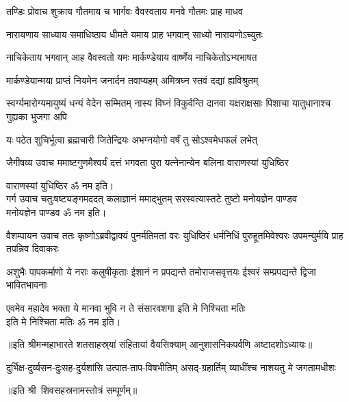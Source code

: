 \twolineshloka
{तण्डिः प्रोवाच शुक्राय गौतमाय च भार्गवः}%
{वैवस्वताय मनवे गौतमः प्राह माधव}%

\twolineshloka
{नारायणाय साध्याय समाधिष्ठाय धीमते}%
{यमाय प्राह भगवान् साध्यो नारायणोऽच्युतः}%

\twolineshloka
{नाचिकेताय भगवान् आह वैवस्वतो यमः}%
{मार्कण्डेयाय वार्ष्णेय नाचिकेतोऽभ्यभाषत}%

\twolineshloka
{मार्कण्डेयान्मया प्राप्तं नियमेन जनार्दन}%
{तवाप्यहम् अमित्रघ्न स्तवं दद्यां ह्यविश्रुतम्}%



\threelineshloka
{स्वर्ग्यमारोग्यमायुष्यं धन्यं वेदेन सम्मितम्}
{नास्य विघ्नं विकुर्वन्ति दानवा यक्षराक्षसाः}%
{पिशाचा यातुधानाश्च गुह्यका भुजगा अपि}%

\twolineshloka
{यः पठेत शुचिर्भूत्वा ब्रह्मचारी जितेन्द्रियः}%
{अभग्नयोगो वर्षं तु सोऽश्वमेधफलं लभेत्}%

जैगीषव्य उवाच
\twolineshloka
{ममाष्टगुणमैश्वर्यं दत्तं भगवता पुरा}%
{यत्नेनान्येन बलिना वाराणस्यां युधिष्ठिर}%

वाराणस्यां युधिष्ठिर ॐ नम इति।\\

\newpage
गर्ग उवाच
\twolineshloka
{चतुःषष्ट्यङ्गमददत् कलाज्ञानं ममाद्भुतम्}%
{सरस्वत्यास्तटे तुष्टो मनोयज्ञेन पाण्डव}\mbox{}\\[-1.6em]%
मनोयज्ञेन पाण्डव ॐ नम इति।

वैशम्पायन उवाच
\threelineshloka
{ततः कृष्णोऽब्रवीद्वाक्यं पुनर्मतिमतां वरः}
{युधिष्ठिरं धर्मनिधिं पुरुहूतमिवेश्वरः}%
{उपमन्युर्मयि प्राह तपन्निव दिवाकरः}%

\threelineshloka
{अशुभैः पापकर्माणो ये नराः कलुषीकृताः}
{ईशानं न प्रपद्यन्ते तमोराजसवृत्तयः}%
{ईश्वरं सम्प्रपद्यन्ते द्विजा भावितभावनाः}%


\twolineshloka
{एवमेव महादेव भक्ता ये मानवा भुवि}%
{न ते संसारवशगा इति मे निश्चिता मतिः}\mbox{}\\[-1.6em]%
इति मे निश्चिता मतिः ॐ नम इति।

॥इति श्रीमन्महाभारते शतसाहस्र्यां संहितायां वैयसिक्याम् आनुशासनिकपर्वणि अष्टादशोऽध्यायः॥

{दुर्भिक्ष-दुर्व्यसन-दुःसह-दुर्यशांसि}
{उत्पात-ताप-विषभीतिम् असद्‌-ग्रहार्तिम्}
{व्याधींश्च नाशयतु मे जगतामधीशः}

॥इति श्री~शिवसहस्रनामस्तोत्रं सम्पूर्णम्॥